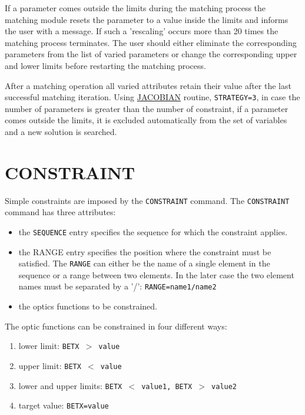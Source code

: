 If a parameter comes outside the
limits during the matching process the matching module resets the
parameter to a value inside the limits and informs the user with a
message. If such a 'rescaling' occurs more than 20 times the matching
process terminates. The user should either eliminate the corresponding
parameters from the list of varied parameters or change the
corresponding upper and lower limits before restarting the matching
process. 

After a matching operation all varied attributes retain their
value after the last successful matching iteration. Using
\hyperref[subsec:match-jacobian]{JACOBIAN} routine, {\tt STRATEGY=3}, in case
the number of parameters is greater than the number of constraint, if a
parameter comes outside the limits, it is excluded automatically from
the set of variables and a new solution is searched.  




%

\section{CONSTRAINT}
\label{sec:constraint}

Simple constraints are imposed by the {\tt CONSTRAINT} command. 
The {\tt CONSTRAINT} command has three attributes:   
\begin{itemize}
 \item  the {\tt SEQUENCE} entry specifies the sequence for which the
   constraint applies.  
 \item  the RANGE entry specifies the position where the
   constraint must be satisfied. The {\tt RANGE} can either be the name
   of a single element in the sequence or a range between two
   elements. In the later case the two element names must be
   separated by a '/': {\tt RANGE=name1/name2}  
 \item the optics functions to be constrained. 
\end{itemize} 

The optic functions can be constrained in four different ways: 
\begin{enumerate}
 \item lower limit: {\tt BETX $>$ value}
 \item upper limit: {\tt BETX $<$ value}
 \item lower and upper limits: {\tt BETX $<$ value1, 
   BETX $>$ value2} 
 \item target value: {\tt BETX=value}
\end{enumerate} 

